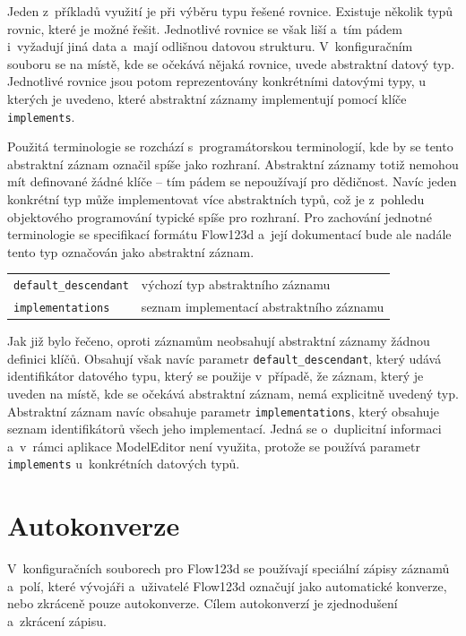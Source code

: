 \documentclass[FM,bw,DP]{tulthesis}
\begin{document}
Jeden z~příkladů využití je při výběru typu řešené rovnice. Existuje několik typů rovnic, které je možné řešit. Jednotlivé rovnice se však liší a~tím pádem i~vyžadují jiná data a~mají odlišnou datovou strukturu. V~konfiguračním souboru se na místě, kde se očekává nějaká rovnice, uvede abstraktní datový typ. Jednotlivé rovnice jsou potom reprezentovány konkrétními datovými typy, u kterých je uvedeno, které abstraktní záznamy implementují pomocí klíče \texttt{implements}.

Použitá terminologie se rozchází s~programátorskou terminologií, kde by se tento abstraktní záznam označil spíše jako rozhraní. Abstraktní záznamy totiž nemohou mít definované žádné klíče -- tím pádem se nepoužívají pro dědičnost. Navíc jeden konkrétní typ může implementovat více abstraktních typů, což je z~pohledu objektového programování typické spíše pro rozhraní. Pro zachování jednotné terminologie se specifikací formátu Flow123d a~její dokumentací bude ale nadále tento typ označován jako abstraktní záznam.

\vspace{0.5cm}
\begin{tabular}{m{5cm}@{}l}
\texttt{default\_descendant}\dotfill & výchozí typ abstraktního záznamu \\
\texttt{implementations}\dotfill & seznam implementací abstraktního záznamu \\
\end{tabular}
\vspace{0.5cm}

Jak již bylo řečeno, oproti záznamům neobsahují abstraktní záznamy žádnou definici klíčů. Obsahují však navíc parametr \texttt{default\_descendant}, který udává identifikátor datového typu, který se použije v~případě, že záznam, který je uveden na místě, kde se očekává abstraktní záznam, nemá explicitně uvedený typ. Abstraktní záznam navíc obsahuje parametr \texttt{implementations}, který obsahuje seznam identifikátorů všech jeho implementací. Jedná se o~duplicitní informaci a~v~rámci aplikace ModelEditor není využita, protože se používá parametr \texttt{implements} u~konkrétních datových typů.


\section{Autokonverze}
\label{sec:analyza-autokonverze}

V~konfiguračních souborech pro Flow123d se používají speciální zápisy záznamů a~polí, které vývojáři a~uživatelé Flow123d označují jako automatické konverze, nebo zkráceně pouze autokonverze. Cílem autokonverzí je zjednodušení a~zkrácení zápisu.
\end{document}
